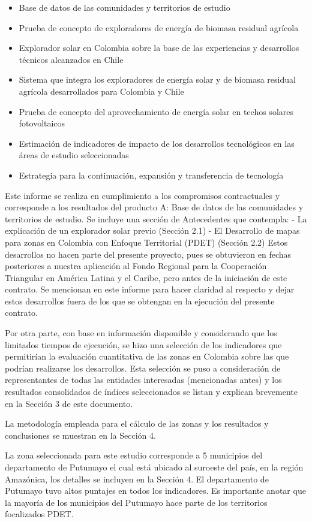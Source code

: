 \begin{itemize}
\item Base de datos de las comunidades y territorios de estudio
\item Prueba de concepto de exploradores de energía de biomasa residual agrícola
\item Explorador solar en Colombia sobre la base de las experiencias y desarrollos técnicos
alcanzados en Chile
\item Sistema que integra los exploradores de energía solar y de biomasa residual agrícola
desarrollados para Colombia y Chile
\item Prueba de concepto del aprovechamiento de energía solar en techos solares fotovoltaicos
\item Estimación de indicadores de impacto de los desarrollos tecnológicos en las áreas de estudio
seleccionadas
\item Estrategia para la continuación, expansión y transferencia de tecnología
\end{itemize}


Este informe se realiza en cumplimiento a los compromisos contractuales y corresponde a los resultados del producto A: Base de datos de las comunidades y
territorios de estudio. Se incluye una sección de Antecedentes que contempla:
- La explicación de un explorador solar previo (Sección 2.1)
- El Desarrollo de mapas para zonas en Colombia con Enfoque Territorial (PDET) (Sección 2.2)
Estos desarrollos no hacen parte del presente proyecto, pues se obtuvieron en fechas posteriores a nuestra aplicación al Fondo Regional para la Cooperación
Triangular en América Latina y el Caribe, pero antes de la iniciación de este contrato. Se mencionan en este informe para hacer claridad al respecto y dejar
estos desarrollos fuera de los que se obtengan en la ejecución del presente contrato.

Por otra parte, con base en información disponible y considerando que los limitados tiempos de ejecución, se hizo una selección de los indicadores que
permitirían la evaluación cuantitativa de las zonas en Colombia sobre las que podrían realizarse los desarrollos. Esta selección se puso a consideración de
representantes de todas las entidades interesadas (mencionadas antes) y los resultados consolidados de índices seleccionados se listan y explican brevemente en
la Sección 3 de este documento.

La metodología empleada para el cálculo de las zonas y los resultados y conclusiones se muestran en la Sección 4.

La zona seleccionada para este estudio corresponde a 5 municipios del departamento de Putumayo el cual está ubicado al suroeste del país, en la región
Amazónica, los detalles se incluyen en la Sección 4. El departamento de Putumayo tuvo altos puntajes en todos los indicadores. Es importante anotar que la
mayoría de los municipios del Putumayo hace parte de los territorios focalizados PDET.
